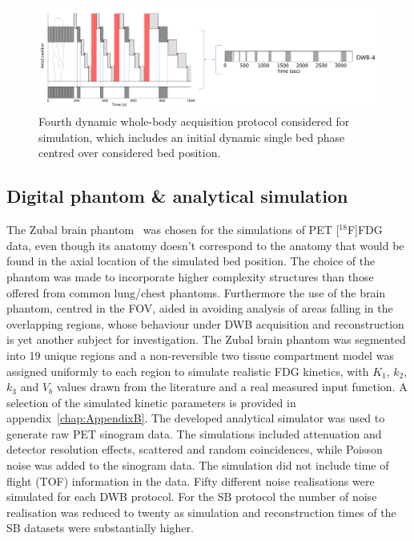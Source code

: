 \begin{figure} [ht!]
\centering
\includegraphics[scale=0.52,angle=0]{3_Results/3_2_Dynamic_Reconstruction_SimulationStudy/figures/AdditionalProtocolDWB4.pdf}
\caption{Fourth dynamic whole-body acquisition protocol considered for simulation, which includes an initial dynamic single bed phase centred over considered bed position.} 
\label{fig:DWB4_Protocol}
\end{figure}

\subsection{Digital phantom \& analytical simulation}

The Zubal brain phantom~\cite{Zubal1994} was chosen for the simulations of PET [$^{18}$F]FDG data, even though its anatomy doesn't correspond to the anatomy that would be found in the axial location of the simulated bed position. The choice of the phantom was made to incorporate higher complexity structures than those offered from common lung/chest phantoms. Furthermore the use of the brain phantom, centred in the FOV, aided in avoiding analysis of areas falling in the overlapping regions, whose behaviour under DWB acquisition and reconstruction is yet another subject for investigation. The Zubal brain phantom was segmented into 19 unique regions and a non-reversible two tissue compartment model was assigned uniformly to each region to simulate realistic FDG kinetics, with $K_1$, $k_2$, $k_3$ and $V_b$ values drawn from the literature and a real measured input function. A selection of the simulated kinetic parameters is provided in appendix~\ref{chap:AppendixB}.
The developed analytical simulator was used to generate raw PET sinogram data. The simulations included attenuation and detector resolution effects, scattered and random coincidences, while Poisson noise was added to the sinogram data. %
The simulation did not include time of flight (TOF) information in the data. Fifty different noise realisations were simulated for each DWB protocol. For the SB protocol the number of noise realisation was reduced to twenty as simulation and reconstruction times of the SB datasets were substantially higher.

